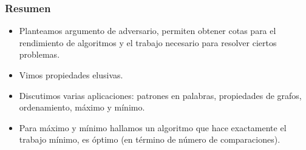 \documentclass[english, spanish, fleqn,%
hyperref = {colorlinks, urlcolor = blue}%
]{beamer}
\begin{document}
\begin{frame}
  \setcounter{beamerpauses}{2}
  \frametitle{Resumen}

  \begin{itemize}
  \item
    Planteamos argumento de adversario,
    permiten obtener cotas para el rendimiento de algoritmos
    y el trabajo necesario para resolver ciertos problemas.
  \item
    Vimos propiedades elusivas.
  \item
    Discutimos varias aplicaciones:
    patrones en palabras,
    propiedades de grafos,
    ordenamiento,
    máximo y mínimo.
  \item
    Para máximo y mínimo
    hallamos un algoritmo que hace exactamente el trabajo mínimo,
    es óptimo
    (en término de número de comparaciones).
  \end{itemize}
\end{frame}
\end{document}
